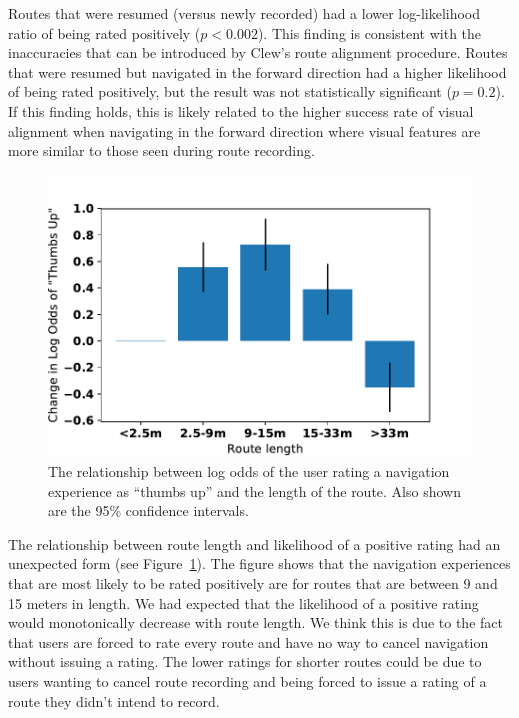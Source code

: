 \documentclass[chi_draft]{sigchi}
\begin{document}
Routes that were resumed (versus newly recorded) had a lower log-likelihood ratio of being rated positively ($p < 0.002$).  This finding is consistent with the inaccuracies that can be introduced by Clew's route alignment procedure.  Routes that were resumed but navigated in the forward direction had a higher likelihood of being rated positively, but the result was not statistically significant ($p = 0.2$). If this finding holds, this is likely related to the higher success rate of visual alignment when navigating in the forward direction where visual features are more similar to those seen during route recording.

\begin{figure}
\includegraphics[width=\linewidth]{figures/routelength}
\caption{The relationship between log odds of the user rating a navigation experience as ``thumbs up'' and the length of the route.  Also shown are the 95\% confidence intervals.\label{fig:routelength}}
\end{figure}

The relationship between route length and likelihood of a positive rating had an unexpected form (see Figure~\ref{fig:routelength}).  The figure shows that the navigation experiences that are most likely to be rated positively are for routes that are between 9 and 15 meters in length. We had expected that the likelihood of a positive rating would monotonically decrease with route length.  We think this is due to the fact that users are forced to rate every route and have no way to cancel navigation without issuing a rating.  The lower ratings for shorter routes could be due to users wanting to cancel route recording and being forced to issue a rating of a route they didn't intend to record.
\end{document}
